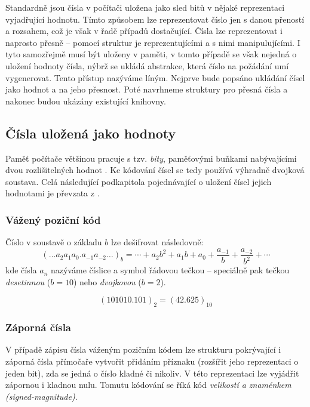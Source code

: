 Standardně jsou čísla v počítači uložena jako sled bitů v nějaké reprezentaci vyjadřující hodnotu. Tímto způsobem lze reprezentovat číslo jen s danou přeností a rozsahem, což je však v řadě případů dostačující. Čísla lze reprezentovat i naprosto přesně -- pomocí struktur je reprezentujícími a s nimi manipulujícími. I tyto samozřejmě musí být uloženy v paměti, v tomto případě se však nejedná o uložení hodnoty čísla, nýbrž se ukládá abstrakce, která číslo na požádání umí vygenerovat. Tento přístup nazýváme líným. Nejprve bude popsáno ukládání čísel jako hodnot a na jeho přesnost. Poté navrhneme struktury pro přesná čísla a nakonec budou ukázány existující knihovny.

\subsection{Čísla uložená jako hodnoty}
Paměť počítače většinou pracuje s tzv. \textit{bity}, paměťovými buňkami nabývajícími dvou rozlišitelných hodnot \cite{KepOS}. Ke kódování čísel se tedy používá výhradně dvojková soustava. Celá následující podkapitola pojednávající o uložení čísel jejich hodnotami je převzata z \cite{Knu02}.

\subsubsection{Vážený poziční kód}
Číslo v soustavě o základu $b$ lze dešifrovat následovně:
\begin{equation}
(\ldots a_2a_1a_0.a_{-1}a_{-2} \ldots )_b = \cdots + a_2b^2 + a_1b + a_0 + \frac{a_{-1}}{b} + \frac{a_{-2}}{b^2} + \cdots
\end{equation}kde čísla $a_n$ nazýváme číslice a symbol  řádovou tečkou -- speciálně pak tečkou \textit{desetinnou} ($b=10$) nebo \textit{dvojkovou} ($b=2$).

\begin{example}
\begin{equation}
(101010.101)_2 = (42.625)_{10}
\end{equation}
\end{example}

\subsubsection{Záporná čísla}
V případě zápisu čísla váženým pozičním kódem lze strukturu pokrývající i záporná čísla přímočaře vytvořit přidáním příznaku (rozšířit jeho reprezentaci o jeden bit), zda se jedná o číslo kladné či nikoliv. V této reprezentaci lze vyjádřit zápornou i kladnou nulu. Tomutu kódování se říká kód \textit{velikostí a znaménkem (signed-magnitude)}.

